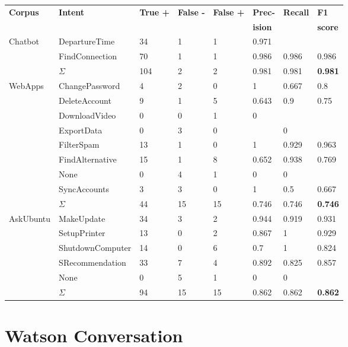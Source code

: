 \begin{center}
    \begin{tabular}{l l l l l l l l}
        \textbf{Corpus} & \textbf{Intent} & \textbf{True +} & \textbf{False -} & \textbf{False +} & \textbf{Prec-} & \textbf{Recall} & \textbf{F1}\\
        & & & & & \textbf{ision} & & \textbf{score} \\
        \hline
        \multirow{3}{*}{Chatbot} & DepartureTime & 34 & 1 & 1 & 0.971 & &  \\
        & FindConnection & 70 & 1 & 1 & 0.986 & 0.986 & 0.986 \\
        & $\Sigma$ & 104 & 2 & 2 & 0.981 & 0.981 & \textbf{0.981} \\
        \hline
        \multirow{9}{*}{WebApps} & ChangePassword & 4 & 2 & 0 & 1 & 0.667 & 0.8 \\
        & DeleteAccount & 9 & 1 & 5 & 0.643 & 0.9 & 0.75 \\
        & DownloadVideo & 0 & 0 & 1 & 0 & &  \\
        & ExportData & 0 & 3 & 0 & & 0 &  \\
        & FilterSpam & 13 & 1 & 0 & 1 & 0.929 & 0.963 \\
        & FindAlternative & 15 & 1 & 8 & 0.652 & 0.938 & 0.769 \\
        & None & 0 & 4 & 1 & 0 & 0 &  \\
        & SyncAccounts & 3 & 3 & 0 & 1 & 0.5 & 0.667 \\
        & $\Sigma$ & 44 & 15 & 15 & 0.746 & 0.746 & \textbf{0.746} \\
        \hline
        \multirow{6}{*}{AskUbuntu} \hspace*{-3mm} & MakeUpdate & 34 & 3 & 2 & 0.944 & 0.919 & 0.931 \\
        & SetupPrinter & 13 & 0 & 2 & 0.867 & 1 & 0.929 \\
        & ShutdownComputer \hspace*{-3mm} & 14 & 0 & 6 & 0.7 & 1 & 0.824 \\
        & SRecommendation & 33 & 7 & 4 & 0.892 & 0.825 & 0.857\\
        & None & 0 & 5 & 1 & 0 & 0 \\
        & $\Sigma$ & 94 & 15 & 15 & 0.862 & 0.862 & \textbf{0.862}\\
        \hline
    \end{tabular}
\end{center}

\section{Watson Conversation}
\label{sec:recalculations_watson}
\vspace*{1cm}

